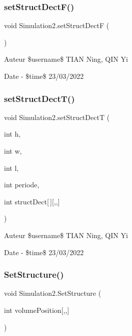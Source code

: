 \subsubsection{\texorpdfstring{set\+Struct\+Dect\+F()}{setStructDectF()}}
{\footnotesize\ttfamily void Simulation2.\+set\+Struct\+DectF (\begin{DoxyParamCaption}{ }\end{DoxyParamCaption})\hspace{0.3cm}{\ttfamily [inline]}}

\begin{DoxyAuthor}{Auteur}
\$username\$ T\+I\+AN Ning, Q\+IN Yi 
\end{DoxyAuthor}
\begin{DoxyDate}{Date}
-\/ \$time\$ 23/03/2022 
\end{DoxyDate}
\mbox{\label{class_simulation2_a4d1dfe65ceaf3256baba8a57efdabdd2}} 
\subsubsection{\texorpdfstring{set\+Struct\+Dect\+T()}{setStructDectT()}}
{\footnotesize\ttfamily void Simulation2.\+set\+Struct\+DectT (\begin{DoxyParamCaption}\item[{int}]{h,  }\item[{int}]{w,  }\item[{int}]{l,  }\item[{int}]{periode,  }\item[{int}]{struct\+Dect\mbox{[}$\,$\mbox{]}\mbox{[},,\mbox{]} }\end{DoxyParamCaption})\hspace{0.3cm}{\ttfamily [inline]}}

\begin{DoxyAuthor}{Auteur}
\$username\$ T\+I\+AN Ning, Q\+IN Yi 
\end{DoxyAuthor}
\begin{DoxyDate}{Date}
-\/ \$time\$ 23/03/2022 
\end{DoxyDate}
\mbox{\label{class_simulation2_a8508ba06258751760b848e98c57ce06d}} 
\subsubsection{\texorpdfstring{Set\+Structure()}{SetStructure()}}
{\footnotesize\ttfamily void Simulation2.\+Set\+Structure (\begin{DoxyParamCaption}\item[{int}]{volume\+Position\mbox{[},,\mbox{]} }\end{DoxyParamCaption})\hspace{0.3cm}{\ttfamily [inline]}}



